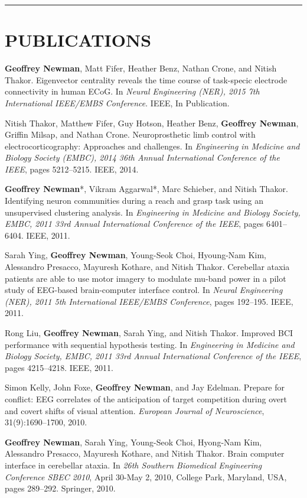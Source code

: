 \documentclass[margin]{res}
\begin{document}
\begin{resume}
\rule{\linewidth}{1mm}  %
	
\section{\MakeUppercase{Publications}}

\textbf{Geoffrey Newman}, Matt Fifer, Heather Benz, Nathan Crone, and Nitish Thakor. Eigenvector centrality reveals the time course of task-specic electrode connectivity in human ECoG. In \textit{Neural Engineering (NER), 2015 7th International IEEE/EMBS Conference}. IEEE, In Publication.

Nitish Thakor, Matthew Fifer, Guy Hotson, Heather Benz, \textbf{Geoffrey Newman}, Griffin Milsap, and Nathan Crone. Neuroprosthetic limb control with electrocorticography: Approaches and challenges. In \textit{Engineering in Medicine and Biology Society (EMBC), 2014 36th Annual International Conference of the IEEE}, pages 5212--5215. IEEE, 2014.

\textbf{Geoffrey Newman}*, Vikram Aggarwal*, Marc Schieber, and Nitish Thakor. Identifying neuron communities during a reach and grasp task using an unsupervised clustering analysis. In \textit{Engineering in Medicine and Biology Society, EMBC, 2011 33rd Annual International Conference of the IEEE}, pages 6401--6404. IEEE, 2011.

Sarah Ying, \textbf{Geoffrey Newman}, Young-Seok Choi, Hyoung-Nam Kim, Alessandro Presacco, Mayuresh Kothare, and Nitish Thakor. Cerebellar ataxia patients are able to use motor imagery to modulate mu-band power in a pilot study of EEG-based brain-computer interface control. In \textit{Neural Engineering (NER), 2011 5th International IEEE/EMBS Conference}, pages 192--195. IEEE, 2011.

Rong Liu, \textbf{Geoffrey Newman}, Sarah Ying, and Nitish Thakor. Improved BCI performance with sequential hypothesis testing. In \textit{Engineering in Medicine and Biology Society, EMBC, 2011 33rd Annual International Conference of the IEEE}, pages 4215--4218. IEEE, 2011.

Simon Kelly, John Foxe, \textbf{Geoffrey Newman}, and Jay Edelman. Prepare for conflict: EEG correlates of the anticipation of target competition during overt and covert shifts of visual attention. \textit{European Journal of Neuroscience}, 31(9):1690--1700, 2010.

\textbf{Geoffrey Newman}, Sarah Ying, Young-Seok Choi, Hyong-Nam Kim, Alessandro Presacco, Mayuresh Kothare, and Nitish Thakor. Brain computer interface in cerebellar ataxia. In \textit{26th Southern Biomedical Engineering Conference SBEC 2010}, April 30-May 2, 2010, College Park, Maryland, USA, pages 289--292. Springer, 2010.


\end{resume}
\end{document}
